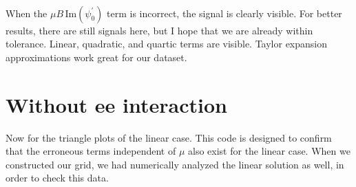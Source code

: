 \documentclass[11pt]{article}
\begin{document}
    \begin{center}
    \end{center}
    { \hspace*{\fill} \\}
    
    When the \(\mu B \, \mathrm{Im}(\psi^\prime_0)\) term is incorrect, the
signal is clearly visible. For better results, there are still signals
here, but I hope that we are already within tolerance. Linear,
quadratic, and quartic terms are visible. Taylor expansion
approximations work great for our dataset.

    \hypertarget{without-ee-interaction}{%
\section{Without ee interaction}\label{without-ee-interaction}}

    Now for the triangle plots of the linear case. This code is designed to
confirm that the erroneous terms independent of \(\mu\) also exist for
the linear case. When we constructed our grid, we had numerically
analyzed the linear solution as well, in order to check this data.
\end{document}
